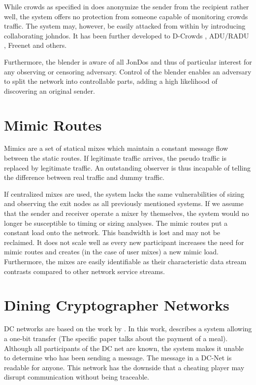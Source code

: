 While crowds as specified in \cite{crowds:tissec} does anonymize the sender from the recipient rather well, the system offers no protection from someone capable of monitoring crowds traffic. The system may, however, be easily attacked from within by introducing collaborating johndos. It has been further developed to D-Crowds \cite{crowdsAttack}, ADU/RADU \cite{Munoz-Gea2008}, Freenet\cite{freenet} and others. 

Furthermore, the blender is aware of all JonDos and thus of particular interest for any observing or censoring adversary. Control of the blender enables an adversary to split the network into controllable parts, adding a high likelihood of discovering an original sender.

\section{Mimic Routes}
Mimics are a set of statical mixes which maintain a constant message flow between the static routes. If legitimate traffic arrives, the pseudo traffic is replaced by legitimate traffic. An outstanding observer is thus incapable of telling the difference between real traffic and dummy traffic.

If centralized mixes are used, the system lacks the same vulnerabilities of sizing and observing the exit nodes as all previously mentioned systems. If we assume that the sender and receiver operate a mixer by themselves, the system would no longer be susceptible to timing or sizing analyses. The mimic routes put a constant load onto the network. This bandwidth is lost and may not be reclaimed. It does not scale well as every new participant increases the need for mimic routes and creates (in the case of user mixes) a new mimic load. Furthermore, the mixes are easily identifiable as their characteristic data stream contrasts compared to other network service streams.


\section{Dining Cryptographer Networks}
DC networks are based on the work  by \citeauthor{chaum-dc}\cite{chaum-dc}. In this work, \citeauthor{chaum-dc} describes a system allowing a one-bit transfer (The specific paper talks about the payment of a meal). Although all participants of the DC net are known, the system makes it unable to determine who has been sending a message. The message in a DC-Net is readable for anyone. This network has the downside that a cheating player may disrupt communication without being traceable.


